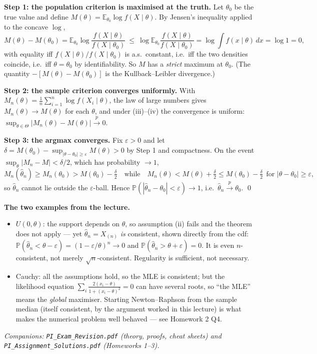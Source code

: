 \documentclass[11pt]{article}
\newcommand{\E}{\mathbb{E}}
\newcommand{\Prob}{\mathbb{P}}
\newcommand{\pto}{\overset{p}{\longrightarrow}}
\begin{document}
\textbf{Step 1: the population criterion is maximised at the truth.} Let $\theta_0$ be the
true value and define $M(\theta)=\E_{\theta_0}\log f(X\mid\theta)$. By Jensen's inequality
applied to the concave $\log$,
\[
M(\theta)-M(\theta_0)=\E_{\theta_0}\log\frac{f(X\mid\theta)}{f(X\mid\theta_0)}
\ \le\ \log\E_{\theta_0}\frac{f(X\mid\theta)}{f(X\mid\theta_0)}
=\log\int f(x\mid\theta)\,dx=\log 1=0 ,
\]
with equality iff $f(X\mid\theta)/f(X\mid\theta_0)$ is a.s.\ constant, i.e.\ iff the two
densities coincide, i.e.\ iff $\theta=\theta_0$ by identifiability. So $M$ has a
\emph{strict} maximum at $\theta_0$. (The quantity $-[M(\theta)-M(\theta_0)]$ is the
Kullback--Leibler divergence.)

\textbf{Step 2: the sample criterion converges uniformly.} With
$M_n(\theta)=\frac1n\sum_{i=1}^n\log f(X_i\mid\theta)$, the law of large numbers gives
$M_n(\theta)\to M(\theta)$ for each $\theta$, and under (iii)--(iv) the convergence is
uniform: $\sup_{\theta\in\Theta}|M_n(\theta)-M(\theta)|\pto0$.

\textbf{Step 3: the argmax converges.} Fix $\varepsilon>0$ and let
$\delta=M(\theta_0)-\sup_{|\theta-\theta_0|\ge\varepsilon}M(\theta)>0$ by Step 1 and
compactness. On the event $\sup_\theta|M_n-M|<\delta/2$, which has probability $\to1$,
\[
M_n(\hat\theta_n)\ge M_n(\theta_0)>M(\theta_0)-\tfrac\delta2
\quad\text{while}\quad
M_n(\theta)<M(\theta)+\tfrac\delta2\le M(\theta_0)-\tfrac\delta2
\ \ \text{for }|\theta-\theta_0|\ge\varepsilon,
\]
so $\hat\theta_n$ cannot lie outside the $\varepsilon$-ball. Hence
$\Prob(|\hat\theta_n-\theta_0|<\varepsilon)\to1$, i.e.\ $\hat\theta_n\pto\theta_0$. \qed

\textbf{The two examples from the lecture.}
\begin{itemize}
\item $U(0,\theta)$: the support depends on $\theta$, so assumption (ii) fails and the theorem
does not apply --- yet $\hat\theta_n=X_{(n)}$ \emph{is} consistent, shown directly from the
cdf: $\Prob(\hat\theta_n<\theta-\varepsilon)=(1-\varepsilon/\theta)^n\to0$ and
$\Prob(\hat\theta_n>\theta+\varepsilon)=0$. It is even $n$-consistent, not merely
$\sqrt n$-consistent. Regularity is sufficient, not necessary.
\item Cauchy: all the assumptions hold, so the MLE is consistent; but the likelihood equation
$\sum_i\frac{2(x_i-\theta)}{1+(x_i-\theta)^2}=0$ can have several roots, so ``the MLE'' means
the \emph{global} maximiser. Starting Newton--Raphson from the sample median (itself
consistent, by the argument worked in this lecture) is what makes the numerical problem
well behaved --- see Homework 2 Q4.
\end{itemize}

\vfill
\begin{center}
\small\itshape
Companions: \texttt{PI\_Exam\_Revision.pdf} (theory, proofs, cheat sheets) and
\texttt{PI\_Assignment\_Solutions.pdf} (Homeworks 1--3).
\end{center}
\end{document}
